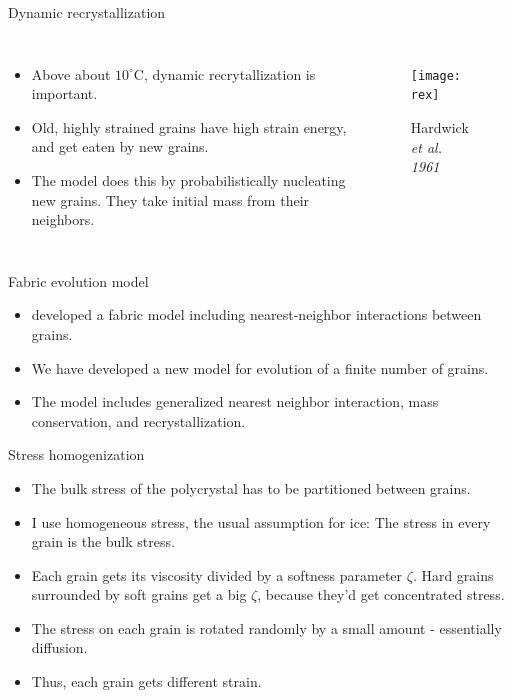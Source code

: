 \documentclass{beamer}
\begin{document}
\begin{frame}{Dynamic recrystallization} 
   \begin{columns}[T]
      \begin{itemize}
         \item Above about $10^{\circ}$C, dynamic recrytallization is important.
         \item Old, highly strained grains have high strain energy, and get eaten by new grains.
         \item The model does this by probabilistically nucleating new grains. They take initial mass from their neighbors.
      \end{itemize}
            \begin{figure}
               \texttt{[image: rex]}
               \caption{Hardwick \it{et al.} 1961}
            \end{figure}
         \end{columns}


\end{frame}


     
 

\begin{frame}{Fabric evolution model}
\begin{itemize}
     \item \citet{thorsteinsson2002nni} developed a fabric model including nearest-neighbor interactions between grains.
      \item We have developed a new model for evolution of a finite number of grains.
      \item The model includes generalized nearest neighbor interaction, mass conservation, and recrystallization.
   \end{itemize}
\end{frame}

\begin{frame}{Stress homogenization}
   \begin{itemize}
      \item The bulk stress of the polycrystal has to be partitioned between grains.
      \item I use homogeneous stress, the usual assumption for ice: The stress in every grain is the bulk stress.
      \item Each grain gets its viscosity divided by a softness parameter $\zeta$. Hard grains surrounded by soft grains get a big $\zeta$, because they'd get concentrated stress.
      \item The stress on each grain is rotated randomly by a small amount - essentially diffusion.
      \item Thus, each grain gets different strain.
   \end{itemize}
\end{frame}
\end{document}
